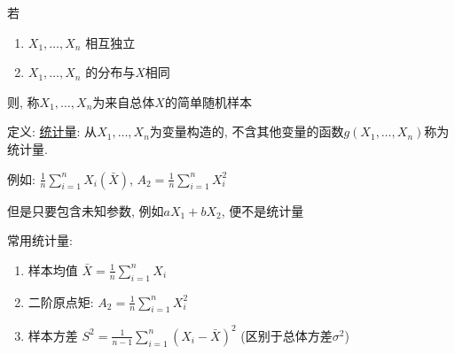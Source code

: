 \documentclass[padp]{ExBook}
\begin{document}
若 
\begin{enumerate}
    \item $X_1, \dots, X_n$ 相互独立
    \item $X_1, \dots, X_n$ 的分布与$X$相同
\end{enumerate}
则, 称$X_1, \dots, X_n$为来自总体$X$的简单随机样本

定义: \underline{统计量}: 从$X_1, \dots, X_n$为变量构造的, 不含其他变量的函数$g(X_1, \dots, X_n)$称为统计量.

例如: $\frac{1}{n}\sum_{i=1}^{n}X_i (\bar{X})$, $A_2 = \frac{1}{n}\sum_{i=1}^{n}X_i^2$

但是只要包含未知参数, 例如$aX_1+bX_2$, 便不是统计量

常用统计量:
\begin{enumerate}
    \item 样本均值 $\bar{X} = \frac{1}{n}\sum_{i=1}^{n}X_i$
    \item 二阶原点矩: $A_2 = \frac{1}{n}\sum_{i=1}^{n}X_i^2$
    \item 样本方差 $S^2 = \frac{1}{n-1}\sum_{i=1}^{n}(X_i-\bar{X})^2$ (区别于总体方差$\sigma^2$)
\end{enumerate}
\end{document}
